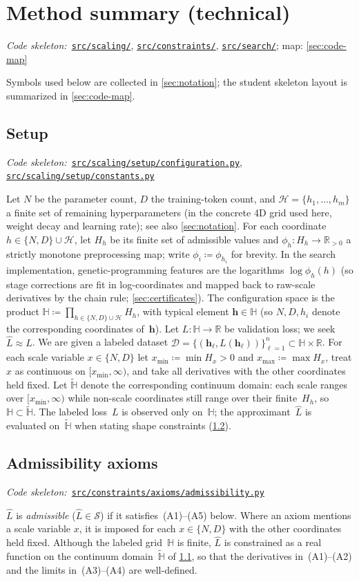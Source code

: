 \documentclass[11pt]{article}
\newcommand{\calD}{\mathcal{D}}
\newcommand{\calH}{\mathcal{H}}
\newcommand{\calS}{\mathcal{S}}
\newcommand{\bbH}{\mathbb{H}}
\newcommand{\bbR}{\mathbb{R}}
\newcommand{\Lhat}{\hat{L}}
\newcommand{\repoBlob}{https://github.com/krichelj/ByteBoost-Shape-Constrained-Boosted-SR/blob/main/}
\newcommand{\repoTree}{https://github.com/krichelj/ByteBoost-Shape-Constrained-Boosted-SR/tree/main/}
\newcommand{\pyFile}[1]{\href{\repoBlob#1}{\nolinkurl{#1}}}
\newcommand{\pyDir}[1]{\href{\repoTree#1}{\nolinkurl{#1/}}}
\newcommand{\codeRef}[1]{%
  \par\nobreak\noindent
  {\footnotesize\textit{Code skeleton:}~#1}\par\smallskip}
\theoremstyle{plain}
\theoremstyle{remark}
\begin{document}
\section{Method summary (technical)}\label{sec:method}
\codeRef{\pyDir{src/scaling}, \pyDir{src/constraints}, \pyDir{src/search}; map: \cref{sec:code-map}}
Symbols used below are collected in \cref{sec:notation}; the student skeleton layout is summarized in \cref{sec:code-map}.

\subsection{Setup}\label{sec:setup}
\codeRef{\pyFile{src/scaling/setup/configuration.py}, \pyFile{src/scaling/setup/constants.py}}
Let $N$ be the parameter count, $D$ the training-token count, and
$\calH = \{h_1, \ldots, h_m\}$ a finite set of remaining hyperparameters
(in the concrete 4D grid used here, weight decay and learning rate); see also \cref{sec:notation}.
For each coordinate $h \in \{N, D\} \cup \calH$, let $H_h$ be its finite set of
admissible values and $\phi_h \colon H_h \to \bbR_{>0}$ a strictly monotone
preprocessing map; write $\phi_i \coloneqq \phi_{h_i}$ for brevity.
In the search implementation, genetic-programming features are the logarithms
$\log\phi_h(h)$ (so stage corrections are fit in log-coordinates and mapped back
to raw-scale derivatives by the chain rule; \cref{sec:certificates}).
The configuration space is the product
$\bbH \coloneqq \prod_{h \in \{N,D\}\cup\calH} H_h$,
with typical element $\mathbf{h} \in \bbH$ (so $N, D, h_i$ denote the corresponding
coordinates of~$\mathbf{h}$).
Let $L \colon \bbH \to \bbR$ be validation loss; we seek $\Lhat \approx L$.
We are given a labeled dataset
$\calD = \{(\mathbf{h}_\ell, L(\mathbf{h}_\ell))\}_{\ell=1}^{n} \subset \bbH \times \bbR$.
For each scale variable $x \in \{N, D\}$ let
$x_{\min} \coloneqq \min H_x > 0$ and
$x_{\max} \coloneqq \max H_x$,
treat $x$ as continuous on
$[x_{\min}, \infty)$, and take all derivatives with the other coordinates held fixed.
Let $\widetilde{\bbH}$ denote the corresponding continuum domain: each scale ranges over
$[x_{\min},\infty)$ while non-scale coordinates still range over their finite~$H_h$,
so $\bbH \subset \widetilde{\bbH}$.
The labeled loss~$L$ is observed only on~$\bbH$; the approximant~$\Lhat$ is evaluated
on~$\widetilde{\bbH}$ when stating shape constraints (\cref{sec:axioms}).

\subsection{Admissibility axioms}\label{sec:axioms}
\codeRef{\pyFile{src/constraints/axioms/admissibility.py}}
$\Lhat$ is \emph{admissible} ($\Lhat \in \calS$) if it satisfies~(A1)--(A5) below.
Where an axiom mentions a scale variable $x$, it is imposed for each
$x \in \{N, D\}$ with the other coordinates held fixed.
Although the labeled grid~$\bbH$ is finite, $\Lhat$ is constrained as a real function on
the continuum domain~$\widetilde{\bbH}$ of \cref{sec:setup}, so that the derivatives
in~(A1)--(A2) and the limits in~(A3)--(A4) are well-defined.
\end{document}
